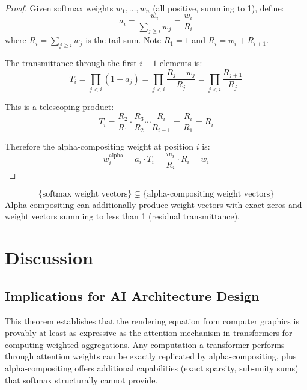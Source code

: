\documentclass[twoside,11pt]{article}
\begin{document}
\begin{proof}
Given softmax weights $w_1, \ldots, w_n$ (all positive, summing to 1), define:
\begin{equation}
a_i = \frac{w_i}{\sum_{j \geq i} w_j} = \frac{w_i}{R_i}
\end{equation}
where $R_i = \sum_{j \geq i} w_j$ is the tail sum. Note $R_1 = 1$ and $R_i = w_i + R_{i+1}$.

The transmittance through the first $i-1$ elements is:
\begin{equation}
T_i = \prod_{j < i}(1 - a_j) = \prod_{j < i}\frac{R_j - w_j}{R_j} = \prod_{j < i}\frac{R_{j+1}}{R_j}
\end{equation}

This is a telescoping product:
\begin{equation}
T_i = \frac{R_2}{R_1} \cdot \frac{R_3}{R_2} \cdots \frac{R_i}{R_{i-1}} = \frac{R_i}{R_1} = R_i
\end{equation}

Therefore the alpha-compositing weight at position $i$ is:
\begin{equation}
w_i^{\text{alpha}} = a_i \cdot T_i = \frac{w_i}{R_i} \cdot R_i = w_i
\end{equation}
\end{proof}

\begin{corollary}
\begin{equation}
\{\text{softmax weight vectors}\} \subsetneq \{\text{alpha-compositing weight vectors}\}
\end{equation}
Alpha-compositing can additionally produce weight vectors with exact zeros and weight vectors summing to less than 1 (residual transmittance).
\end{corollary}

\section{Discussion}

\subsection{Implications for AI Architecture Design}

This theorem establishes that the rendering equation from computer graphics is provably at least as expressive as the attention mechanism in transformers for computing weighted aggregations. Any computation a transformer performs through attention weights can be exactly replicated by alpha-compositing, plus alpha-compositing offers additional capabilities (exact sparsity, sub-unity sums) that softmax structurally cannot provide.
\end{document}
